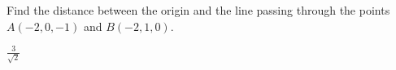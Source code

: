 
\begin{Exercise}[
name={},
title={}, 
difficulty=0,
origin={\cite{BS}}]
Find the distance between the origin and the line passing through the points $A(-2, 0, -1)$ and $B(-2, 1, 0)$.
\end{Exercise}
\begin{Answer}
	$\frac{3}{\sqrt{2}}$
\end{Answer}
